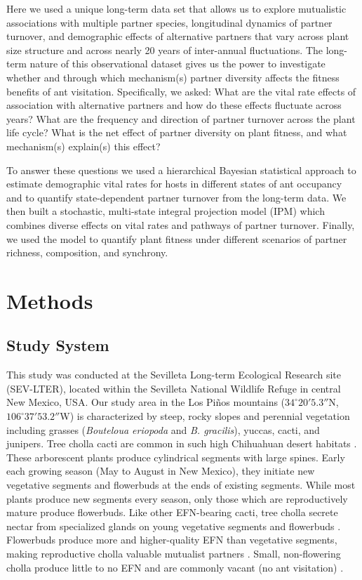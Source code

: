\documentclass[11pt]{article}
\begin{document}
Here we used a unique long-term data set that allows us to explore mutualistic associations with multiple partner species, longitudinal dynamics of partner turnover, and demographic effects of alternative partners that vary across plant size structure and across nearly 20 years of inter-annual fluctuations. 
The long-term nature of this observational dataset gives us the power to investigate whether and through which mechanism(s) partner diversity affects the fitness benefits of ant visitation. 
Specifically, we asked: What are the vital rate effects of association with alternative partners and how do these effects fluctuate across years? 
What are the frequency and direction of partner turnover across the plant life cycle?
What is the net effect of partner diversity on plant fitness, and what mechanism(s) explain(s) this effect?

To answer these questions we used a hierarchical Bayesian statistical approach to estimate demographic vital rates for hosts in different states of ant occupancy and to quantify state-dependent partner turnover from the long-term data. 
We then built a stochastic, multi-state integral projection model (IPM) which combines diverse effects on vital rates and pathways of partner turnover. 
Finally, we used the model to quantify plant fitness under different scenarios of partner richness, composition, and synchrony.

\section*{Methods}
\subsection*{Study System}
  
This study was conducted at the Sevilleta Long-term Ecological Research site (SEV-LTER), located within the Sevilleta National Wildlife Refuge in central New Mexico, USA.
Our study area in the Los Pi\~nos mountains ($34^\circ20'5.3''$N, $106^\circ37'53.2''$W) is characterized by steep, rocky slopes and perennial vegetation including grasses (\textit{Bouteloua eriopoda} and \textit{B. gracilis}), yuccas, cacti, and junipers. 
Tree cholla cacti are common in such high Chihuahuan desert habitats \citep{Benson1982}. 
These arborescent plants produce cylindrical segments with large spines. 
Early each growing season (May to August in New Mexico), they initiate new vegetative segments and flowerbuds at the ends of existing segments. 
While most plants produce new segments every season, only those which are reproductively mature produce flowerbuds. 
Like other EFN-bearing cacti, tree cholla secrete nectar from specialized glands on young vegetative segments and flowerbuds \citep{Ness2006,Oliveira1999}. 
Flowerbuds produce more and higher-quality EFN than vegetative segments, making reproductive cholla valuable mutualist partners \citep{Miller2014}. 
Small, non-flowering cholla produce little to no EFN and are commonly vacant (no ant visitation) \citep{Miller2014}. 
\end{document}

